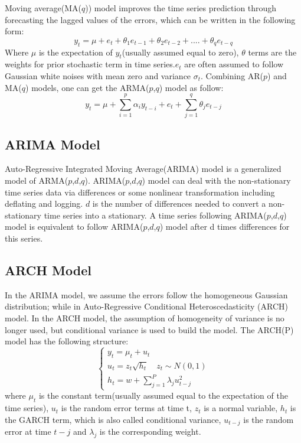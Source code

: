 Moving average(MA($q$)) model improves the time series prediction through forecasting the lagged values of the errors, which can be written in the following form:
\begin{equation}
	y_t = \mu + e_t+\theta_1{e_{t-1}}+\theta_2{e_{t-2}}+....+\theta_q{e_{t-q}}
\end{equation}
Where $\mu$ is the expectation of $y_t$(usually assumed equal to zero), $\theta$ terms are the weights for prior stochastic term in time series.$e_t$ are often assumed to follow Gaussian white noises with mean zero and variance $\sigma_t$. 
Combining AR($p$) and MA($q$) models, one can get the ARMA($p$,$q$) model as follow:
\begin{equation}
   y_t = \mu + \sum_{i=1}^{p} {\alpha_i{y_{t-i}}} + e_t+ \sum_{j=1}^{q} {\theta_j{e_{t-j}}}
\end{equation}

\subsection{ARIMA Model}
\vspace{-0.05in}
Auto-Regressive Integrated Moving Average(ARIMA) model is a generalized model of ARMA($p$,$d$,$q$). ARIMA($p$,$d$,$q$) model can deal with the non-stationary time series data via differences or some nonlinear transformation including deflating and logging. $d$ is the number of differences needed to convert a non-stationary time series into a stationary. A time series following ARIMA($p$,$d$,$q$) model is equivalent to follow ARIMA($p$,$d$,$q$) model after d times differences for this series. 

\subsection{ARCH Model}
\vspace{-0.05in}
In the ARIMA model, we assume the errors follow the homogeneous Gaussian distribution; while in Auto-Regressive Conditional Heteroscedasticity (ARCH) model. In the ARCH model, the assumption of homogeneity of variance is no longer used, but conditional variance is used to build the model. The ARCH(P) model has the following structure:
\begin{equation}
    \begin{cases}
      y_t = \mu_t + u_t \\
      u_t = z_t{\sqrt{h_t}}\quad  z_t\sim N(0,1)\\
      h_t = w+\sum_{j=1}^{P} {\lambda_j{u_{t-j}^2}}
    \end{cases}
\end{equation}
where $\mu_t$ is the constant term(usually assumed equal to the expectation of the time series), $u_t$ is the random error terms at time t, $z_t$ is a normal variable, $h_t$ is the GARCH term, which is also called conditional variance, $u_{t-j}$ is the random error at time $t-j$ and $\lambda_j$ is the corresponding weight. 

